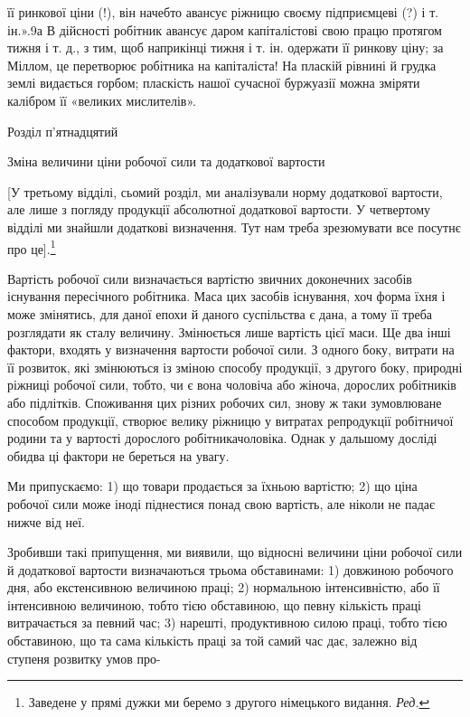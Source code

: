 \parcont{}  %
її ринкової ціни (!), він начебто авансує ріжницю своєму підприємцеві
(?) і т. ін.».9а В дійсності робітник авансує даром
капіталістові свою працю протягом тижня і т. д., з тим, щоб
наприкінці тижня і т. ін. одержати її ринкову ціну; за Міллом,
це перетворює робітника на капіталіста! На пласкій рівнині
й грудка землі видається горбом; пласкість нашої сучасної буржуазії
можна зміряти калібром її «великих мислителів».

Розділ п’ятнадцятий

Зміна величини ціни робочої сили та додаткової
вартости

[У третьому відділі, сьомий розділ, ми аналізували норму
додаткової вартости, але лише з погляду продукції абсолютної
додаткової вартости. У четвертому відділі ми знайшли додаткові
визначення. Тут нам треба зрезюмувати все посутнє про це].\footnote*{
Заведене у прямі дужки ми беремо з другого німецького видання.
\emph{Ред.}
}

Вартість робочої сили визначається вартістю звичних доконечних
засобів існування пересічного робітника. Маса цих засобів
існування, хоч форма їхня і може змінятись, для даної епохи
й даного суспільства є дана, а тому її треба розглядати як сталу
величину. Змінюється лише вартість цієї маси. Ще два інші
фактори, входять у визначення вартости робочої сили. З одного
боку, витрати на її розвиток, які змінюються із зміною способу
продукції, з другого боку, природні ріжниці робочої сили, тобто,
чи є вона чоловіча або жіноча, дорослих робітників або підлітків.
Споживання цих різних робочих сил, знову ж таки зумовлюване
способом продукції, створює велику ріжницю у витратах репродукції
робітничої родини та у вартості дорослого робітникачоловіка.
Однак у дальшому досліді обидва ці фактори не береться
на увагу.

Ми припускаємо: 1) що товари продається за їхньою вартістю;
2) що ціна робочої сили може іноді піднестися понад свою вартість,
але ніколи не падає нижче від неї.

Зробивши такі припущення, ми виявили, що відносні величини
ціни робочої сили й додаткової вартости визначаються
трьома обставинами: 1) довжиною робочого дня, або екстенсивною
величиною праці; 2) нормальною інтенсивністю, або її інтенсивною
величиною, тобто тією обставиною, що певну кількість
праці витрачається за певний час; 3) нарешті, продуктивною
силою праці, тобто тією обставиною, що та сама кількість праці
за той самий час дає, залежно від ступеня розвитку умов про-

